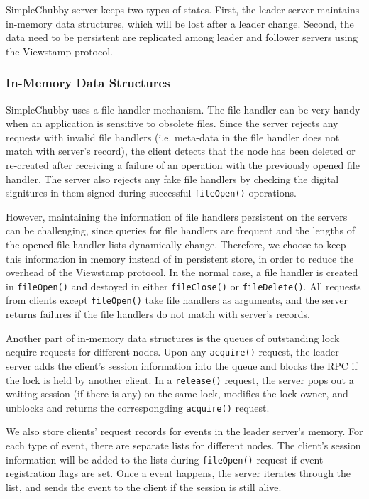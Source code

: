 SimpleChubby server keeps two types of states. First, the
leader server maintains in-memory data structures, which will be lost
after a leader change. Second, the data need to be persistent are replicated
among leader and follower servers using the Viewstamp protocol.


\subsubsection{In-Memory Data Structures}

SimpleChubby uses a file handler mechanism. The file handler can be very
handy when an application is sensitive to obsolete files. Since the server
rejects any requests with invalid file handlers (i.e. meta-data in the file
handler does not match with server's record), the client detects that the node has
been deleted or re-created after receiving a failure of an operation with
the previously opened file handler. The server also rejects any fake file
handlers by checking the digital signitures in them signed during successful
\texttt{fileOpen()} operations.

However, maintaining the information of file handlers persistent on the servers can
be challenging, since queries for file handlers are frequent and the lengths
of the opened file handler lists dynamically change. Therefore, we choose
to keep this information in memory instead of in persistent store, in order
to reduce the overhead of the Viewstamp protocol. In the normal case, a file
handler is created in \texttt{fileOpen()} and destoyed in either
\texttt{fileClose()} or \texttt{fileDelete()}.
All requests from clients except \texttt{fileOpen()} take file handlers as
arguments,
and the server returns failures if the file handlers do not match with
server's records.

Another part of in-memory data structures is the queues of outstanding lock
acquire requests for different nodes. Upon any \texttt{acquire()} request, the
leader server adds the client's session information into the queue and
blocks the RPC if the lock is held by another client.
In a \texttt{release()} request, the server pops out a waiting session
(if there is any) on the same lock, modifies the lock owner, and unblocks and
returns the correspongding \texttt{acquire()} request.

We also store clients' request records for events in the leader server's memory.
For each type of event, there are separate lists for different nodes.
The client's session information will be added to the lists during
\texttt{fileOpen()}
request if event registration flags are set. Once a event happens,
the server iterates through the list, and sends the event to the client if the
session is still alive.

